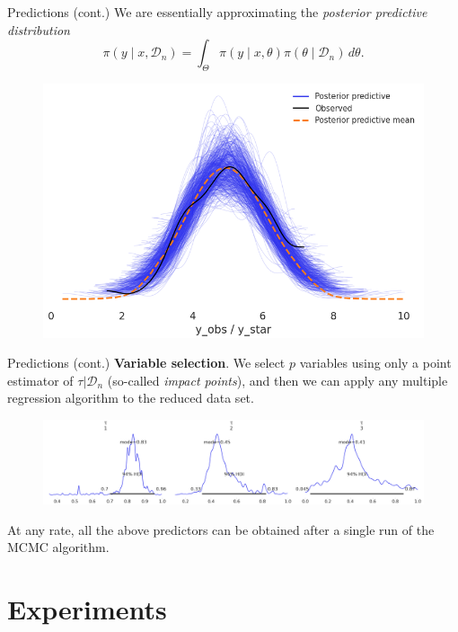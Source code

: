 \documentclass[9pt, english, professionalfonts]{beamer}
\newcommand{\D} {\ensuremath{\mathcal{D}}}
\begin{document}
\begin{frame}{Predictions (cont.)}
    We are essentially approximating the \textit{posterior predictive distribution}
\[
\pi(y\mid x, \D_n) = \int_{\Theta} \pi(y\mid x, \theta)\pi(\theta\mid \D_n)\, d\theta.
\]
  \begin{figure}
    \includegraphics[width=.675\textwidth]{ppc_linear}
  \end{figure}
\end{frame}

\begin{frame}{Predictions (cont.)}
    \textbf{Variable selection}. We select \(p\) variables using only a point estimator of \(\tau|\D_n\) (so-called \textit{impact points}), and then we can apply any multiple regression algorithm to the reduced data set.
    \vspace{1em}

    \begin{figure}
      \includegraphics[width=\textwidth]{credible_intervals}
    \end{figure}

    At any rate, all the above predictors can be obtained after a single run of the MCMC algorithm.
\end{frame}

\section{Experiments}
\end{document}
